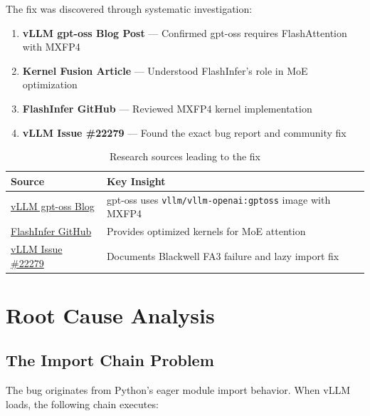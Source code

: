 \documentclass[10pt,letterpaper]{article}
\begin{document}
The fix was discovered through systematic investigation:

\begin{enumerate}[noitemsep]
    \item \textbf{vLLM gpt-oss Blog Post} \cite{vllm-gptoss} --- Confirmed gpt-oss requires FlashAttention with MXFP4 \cite{mxfp4-paper}
    \item \textbf{Kernel Fusion Article} --- Understood FlashInfer's role in MoE optimization
    \item \textbf{FlashInfer GitHub} \cite{flashinfer} --- Reviewed MXFP4 kernel implementation
    \item \textbf{vLLM Issue \#22279} \cite{vllm-blackwell-issue} --- Found the exact bug report and community fix
\end{enumerate}

\begin{table}[H]
\centering
\small
\begin{tabular}{@{}lp{8cm}@{}}
\toprule
\textbf{Source} & \textbf{Key Insight} \\
\midrule
\href{https://blog.vllm.ai/2025/08/05/gpt-oss.html}{vLLM gpt-oss Blog} & gpt-oss uses \texttt{vllm/vllm-openai:gptoss} image with MXFP4 \\
\href{https://github.com/flashinfer-ai/flashinfer}{FlashInfer GitHub} & Provides optimized kernels for MoE attention \\
\href{https://github.com/vllm-project/vllm/issues/22279}{vLLM Issue \#22279} & Documents Blackwell FA3 failure and lazy import fix \\
\bottomrule
\end{tabular}
\caption{Research sources leading to the fix}
\end{table}

\section{Root Cause Analysis}

\subsection{The Import Chain Problem}

The bug originates from Python's eager module import behavior. When vLLM loads, the following chain executes:
\end{document}
